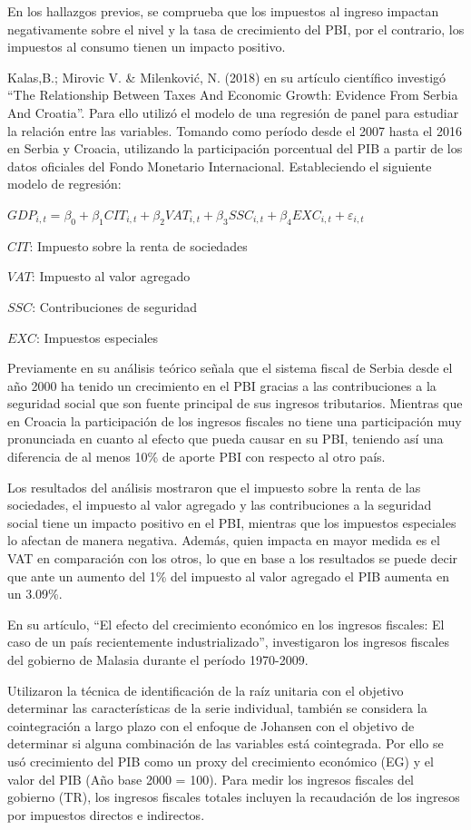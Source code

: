 \documentclass[
  letterpaper,
]{article}
\begin{document}
En los hallazgos previos, se comprueba que los impuestos al ingreso
impactan negativamente sobre el nivel y la tasa de crecimiento del PBI,
por el contrario, los impuestos al consumo tienen un impacto positivo.

Kalas,B.; Mirovic V. \& Milenković, N. (2018) en su artículo científico
investigó ``The Relationship Between Taxes And Economic Growth: Evidence
From Serbia And Croatia''. Para ello utilizó el modelo de una regresión
de panel para estudiar la relación entre las variables. Tomando como
período desde el 2007 hasta el 2016 en Serbia y Croacia, utilizando la
participación porcentual del PIB a partir de los datos oficiales del
Fondo Monetario Internacional. Estableciendo el siguiente modelo de
regresión:

\(GDP_{i, t} = β_0 + β_{1}CIT_{i, t}+ β_{2}VAT_{i, t} + β_{3}SSC_{i, t} + β_{4}EXC_{i, t} + ε_{i, t}\)

\(CIT\): Impuesto sobre la renta de sociedades

\(VAT\): Impuesto al valor agregado

\(SSC\): Contribuciones de seguridad

\(EXC\): Impuestos especiales

Previamente en su análisis teórico señala que el sistema fiscal de
Serbia desde el año 2000 ha tenido un crecimiento en el PBI gracias a
las contribuciones a la seguridad social que son fuente principal de sus
ingresos tributarios. Mientras que en Croacia la participación de los
ingresos fiscales no tiene una participación muy pronunciada en cuanto
al efecto que pueda causar en su PBI, teniendo así una diferencia de al
menos 10\% de aporte PBI con respecto al otro país.

Los resultados del análisis mostraron que el impuesto sobre la renta de
las sociedades, el impuesto al valor agregado y las contribuciones a la
seguridad social tiene un impacto positivo en el PBI, mientras que los
impuestos especiales lo afectan de manera negativa. Además, quien
impacta en mayor medida es el VAT en comparación con los otros, lo que
en base a los resultados se puede decir que ante un aumento del 1\% del
impuesto al valor agregado el PIB aumenta en un 3.09\%.

\textcite{taha_effect_2011} En su artículo, ``El efecto del crecimiento
económico en los ingresos fiscales: El caso de un país recientemente
industrializado'', investigaron los ingresos fiscales del gobierno de
Malasia durante el período 1970-2009.

Utilizaron la técnica de identificación de la raíz unitaria con el
objetivo determinar las características de la serie individual, también
se considera la cointegración a largo plazo con el enfoque de Johansen
con el objetivo de determinar si alguna combinación de las variables
está cointegrada. Por ello se usó crecimiento del PIB como un proxy del
crecimiento económico (EG) y el valor del PIB (Año base 2000 = 100).
Para medir los ingresos fiscales del gobierno (TR), los ingresos
fiscales totales incluyen la recaudación de los ingresos por impuestos
directos e indirectos.
\end{document}
